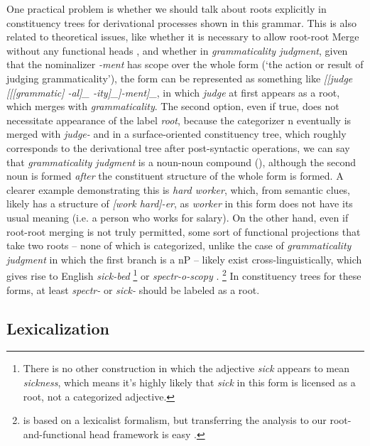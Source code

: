 \documentclass[UTF8, a4paper, oneside, scheme=plain, 12pt]{ctexrep}
\newcommand*{\term}[1]{\emph{#1}}
\newcommand{\form}[1]{\emph{#1}}
\newcommand{\translate}[1]{`#1'}
\begin{document}
{One practical problem is whether we should talk about roots explicitly in 
constituency trees for derivational processes shown in this grammar.
This is also related to theoretical issues,
like whether it is necessary to allow root-root Merge without any functional heads \citep{zhang2007root},
and whether in \form{grammaticality judgment},
given that the nominalizer \form{-ment} has scope over the whole form
(\translate{the action or result of judging grammaticality}),
the form can be represented
as something like \form{[[judge [[[grammatic] -al]_{} -ity]_{}]-ment]_{\text{N}}},
in which \form{judge} at first appears as a root,
which merges with \form{grammaticality}.
The second option, even if true, does not necessitate appearance of the label \term{root},
because the categorizer n eventually is merged with \form{judge-}
and in a surface-oriented constituency tree, which roughly corresponds to the derivational tree after post-syntactic operations, we can say that \form{grammaticality judgment} is a noun-noun compound
(),
although the second noun is formed \emph{after} the constituent structure of the whole form is formed.
A clearer example demonstrating this is \form{hard worker},
which, from semantic clues, likely has a structure of \form{[work hard]-er},
as \form{worker} in this form does not have its usual meaning
(i.e. a person who works for salary).
On the other hand, even if root-root merging is not truly permitted,
some sort of functional projections that take two roots -- none of which is categorized,
unlike the case of \form{grammaticality judgment} in which the first branch is a nP --
likely exist cross-linguistically, which gives rise to English \form{sick-bed}%
\footnote{
    There is no other construction in which the adjective \form{sick} appears to mean \form{sickness},
    which means it's highly likely that \form{sick} in this form is licensed as a root,
    not a categorized adjective.
}
or \form{spectr-o-scopy} \citep{di2005decomposing,scher2014unifying}.%
\footnote{
    \citet{di2005decomposing} is based on a lexicalist formalism,
    but transferring the analysis to our root-and-functional head framework is easy
    \citep{scher2014unifying}.
}
In constituency trees for these forms, at least \form{spectr-} or \form{sick-} should be labeled as a root.

\subsection{Lexicalization}\label{sec:intro.theory.lexicon}

}
\end{document}
